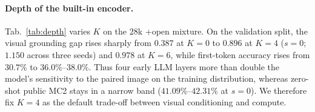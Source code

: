 \documentclass[10pt,twocolumn,letterpaper]{article}
\begin{document}
\paragraph{Depth of the built-in encoder.}
\begin{table}[t]
\centering
\caption{\textbf{Frontend depth} on the $28$k \emph{+open} mixture (\texttt{hyb}
deep tier). Every row comes from a single joint checkpoint ($s{=}0$, plus the
$3$-seed mean at $K{=}4$). Grounding gap is the cross-entropy difference
between shuffled and correctly paired validation images.}
\label{tab:depth}
\footnotesize
\setlength{\tabcolsep}{3.0pt}
\end{table}
Tab.~\ref{tab:depth} varies $K$ on the $28$k +open mixture. On the validation
split, the visual grounding gap rises sharply from $0.387$ at $K{=}0$ to $0.896$
at $K{=}4$ ($s{=}0$; $1.150$ across three seeds) and $0.978$ at $K{=}6$, while
first-token accuracy rises from $30.7\%$ to $36.0\%$--$38.0\%$. Thus four early
LLM layers more than double the model's sensitivity to the paired image on the
training distribution, whereas zero-shot public MC2 stays in a narrow band
($41.09\%$--$42.31\%$ at $s{=}0$). We therefore fix $K{=}4$ as the default
trade-off between visual conditioning and compute.
\end{document}
